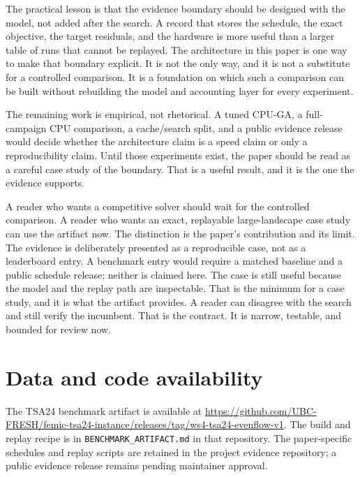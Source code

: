 \documentclass[preprint,11pt]{elsarticle}
\begin{document}
The practical lesson is that the evidence boundary should be designed with the
model, not added after the search. A record that stores the schedule, the exact
objective, the target residuals, and the hardware is more useful than a larger
table of runs that cannot be replayed. The architecture in this paper is one way
to make that boundary explicit. It is not the only way, and it is not a
substitute for a controlled comparison. It is a foundation on which such a
comparison can be built without rebuilding the model and accounting layer for
every experiment.

The remaining work is empirical, not rhetorical. A tuned CPU-GA, a full-campaign CPU comparison, a
cache/search split, and a public evidence release would decide whether the architecture claim is a
speed claim or only a reproducibility claim. Until those experiments exist, the paper should be read
as a careful case study of the boundary. That is a useful result, and it is the one the evidence
supports.

A reader who wants a competitive solver should wait for the controlled comparison. A reader who wants
an exact, replayable large-landscape case study can use the artifact now. The distinction is the
paper's contribution and its limit. The evidence is deliberately presented as a reproducible case, not as a
leaderboard entry. A benchmark entry would require a matched baseline and a
public schedule release; neither is claimed here. The case is still useful because the model and the replay path
are inspectable. That is the minimum for a case study, and it is what the
artifact provides. A reader can disagree with the search and still verify the
incumbent. That is the contract. It is narrow, testable, and bounded for review now.

\section*{Data and code availability}
The TSA24 benchmark artifact is available at
\url{https://github.com/UBC-FRESH/femic-tsa24-instance/releases/tag/ws4-tsa24-evenflow-v1}.
The build and replay recipe is in \texttt{BENCHMARK\_ARTIFACT.md} in that repository. The paper-specific schedules and replay scripts are retained in the project evidence repository; a public evidence release remains pending maintainer approval.




\end{document}
